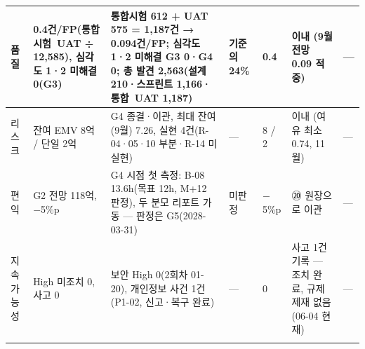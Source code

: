 \documentclass[10pt,a4paper]{article}
\begin{document}
{\begin{tabularx}{\linewidth}{|L{16mm}|L{42mm}|Y|L{22mm}|L{30mm}|L{44mm}|L{24mm}|}
품질 & 0.4건/FP(통합시험~UAT ÷ 12,585), 심각도 1·2 미해결 0(G3) & 통합시험 612 + UAT 575 = \textbf{1,187건 → 0.094건/FP}; 심각도 1·2 미해결 G3 0·G4 0; 총 발견 2,563(설계 210·스프린트 1,166·통합~UAT 1,187) & 기준의 24\% & 0.4 & 이내 (9월 전망 0.09 적중) & — \\ \hline
리스크 & 잔여 EMV 8억 / 단일 2억 & G4 종결·이관, 최대 잔여(9월) 7.26, 실현 4건(R-04·05·10 부분·R-14 미실현) & — & 8 / 2 & 이내 (여유 최소 0.74, 11월) & — \\ \hline
편익 & G2 전망 118억, $-$5\%p & G4 시점 첫 측정: B-08 13.6h(목표 12h, M+12 판정), 두 분모 리포트 가동 — 판정은 G5(2028-03-31) & 미판정 & $-$5\%p & ⑳ 원장으로 이관 & — \\ \hline
지속가능성 & High 미조치 0, 사고 0 & 보안 High 0(2회차 01-20), 개인정보 사건 1건(P1-02, 신고·복구 완료) & — & 0 & 사고 1건 기록 — 조치 완료, 규제 제재 없음(06-04 현재) & — \\ \hline
\fi
\end{tabularx}}
\end{document}

